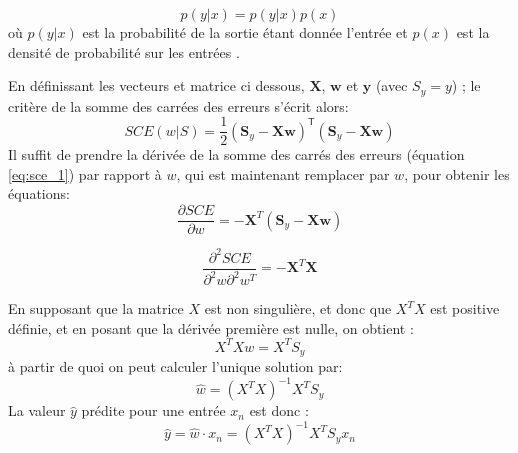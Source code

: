 $$
p(y|x) = p(y|x)p(x)
$$
où $p(y|x)$ est la probabilité de la sortie étant donnée l'entrée et $p(x)$ est la densité de probabilité sur les entrées \cite{matloff2017statistical}.




En définissant les vecteurs  et matrice ci dessous, ${\boldsymbol X}$, ${\boldsymbol w}$ et ${\boldsymbol y}$ (avec ${S_y = y}$) \cite{antoine2018apprentissage}; le critère de la somme des carrées des erreurs s'écrit alors:
\begin{equation}\label{eq:sce_2}
SCE(w|\mathit{S}) = \frac{1}{2} ({\boldsymbol S_y }- \mathbf{X}\boldsymbol w)^{\mathsf{T}}({ \boldsymbol S_y }- \mathbf{X} \boldsymbol w)
\end{equation}  
Il suffit de prendre la dérivée de la somme des carrés des erreurs (équation \ref{eq:sce_1}) par rapport à $w$, qui est maintenant remplacer par $w$, pour obtenir les équations: 
$$
\frac{\partial SCE}{\partial w} = -{\boldsymbol X}^T({\boldsymbol S_y }- \mathbf{X} \boldsymbol w)
$$

$$
\frac{\partial^2 SCE}{\partial^2 w \partial^2 w^T} = -{\boldsymbol X}^T{\boldsymbol X}
$$

En supposant que la matrice $X$ est non singulière, et donc que $X^TX$ est positive définie, et en posant que la dérivée première est nulle, on obtient :
\begin{equation}
{X^{T} Xw =  X^{T} S_y}
\end{equation}
à partir de quoi on peut calculer l'unique solution par: 
\begin{equation}
\hat{w} = {(X^{T} X)^{-1} X^{T} S_y}
\end{equation}
La valeur $\hat{y}$ prédite pour une entrée $x_n$ est donc : 
$$
\hat{y} = \hat{w}\cdot x_n = {(X^{T} X)^{-1} X^{T} S_y}x_n 
$$ 


